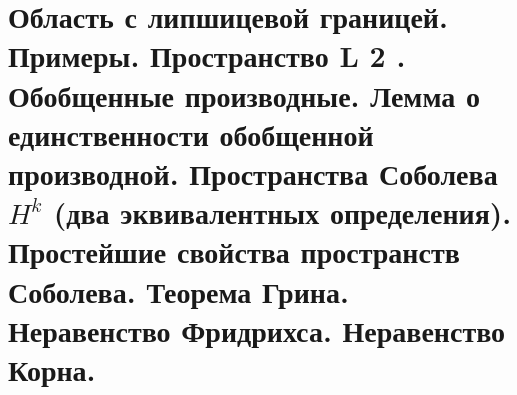 \documentclass[__main__.tex]{subfiles}
\begin{document}
\section{Область с липшицевой границей. Примеры. Пространство L 2 . Обобщенные производные. Лемма о единственности обобщенной производной. Пространства Соболева $H^k$ (два эквивалентных определения). Простейшие свойства пространств Соболева. Теорема Грина. Неравенство Фридрихса. Неравенство Корна.}
\end{document}
